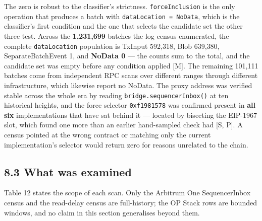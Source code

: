 \documentclass[conference]{IEEEtran}
\renewcommand{\_}{\textunderscore\allowbreak}
\begin{document}
The zero is robust to the classifier's strictness.
\texttt{forceInclusion} is the only operation that produces a batch with
\texttt{dataLocation\ =\ NoData}, which is the classifier's first
condition and the one that selects the candidate set the other three
test. Across the \textbf{1,231,699} batches the log census enumerated,
the complete \texttt{dataLocation} population is TxInput 592,318, Blob
639,380, SeparateBatchEvent 1, and \textbf{NoData 0} --- the counts sum
to the total, and the candidate set was empty before any condition
applied {[}M{]}. The remaining 101,111 batches come from independent RPC
scans over different ranges through different infrastructure, which
likewise report no NoData. The proxy address was verified stable across
the whole era by reading \texttt{bridge.sequencerInbox()} at ten
historical heights, and the force selector \texttt{0xf1981578} was
confirmed present in \textbf{all six} implementations that have sat
behind it --- located by bisecting the EIP-1967 slot, which found one
more than an earlier hand-sampled check had {[}S, P{]}. A census pointed
at the wrong contract or matching only the current implementation's
selector would return zero for reasons unrelated to the chain.

\subsection{8.3 What was examined}\label{what-was-examined}

Table 12 states the scope of each scan. Only the Arbitrum One
SequencerInbox census and the read-delay census are full-history; the OP
Stack rows are bounded windows, and no claim in this section generalises
beyond them.
\end{document}
